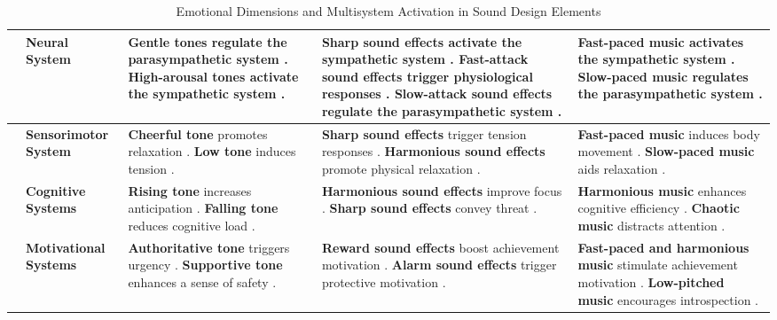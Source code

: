 \begin{table*}[ht]
\begin{tabularx}{\textwidth}{|>{\centering\arraybackslash}m{0.6cm}|>{\centering\arraybackslash}m{1.55cm}|>{\centering\arraybackslash}m{4.6cm}|>{\centering\arraybackslash}m{4.6cm}|>{\centering\arraybackslash}m{4.6cm}|}
\multirow{4}{*}{\rotatebox{90}{\parbox{3cm}{\centering \textbf{Multisystem \\ Activation}}}} & 
\cellcolor[HTML]{F0EFF7} \textbf{Neural System} & 
\textbf{Gentle tones} regulate the parasympathetic system \cite{gobl2003role}. \textbf{High-arousal tones} activate the sympathetic system \cite{bestelmeyer2017effects}. & 
\textbf{Sharp sound effects} activate the sympathetic system \cite{iversen2000emotional}. \textbf{Fast-attack sound effects} trigger physiological responses \cite{iversen2000emotional}. \textbf{Slow-attack sound effects} regulate the parasympathetic system \cite{iversen2000emotional}. & 
\textbf{Fast-paced music} activates the sympathetic system \cite{juslin2008emotional}. \textbf{Slow-paced music} regulates the parasympathetic system \cite{juslin2008emotional}. \\ \cline{2-5}

& \cellcolor[HTML]{F0EFF7} \textbf{Sensorimotor System} & 
\textbf{Cheerful tone} promotes relaxation \cite{frijda1986emotions}. \textbf{Low tone} induces tension \cite{james1884mind}. & 
\textbf{Sharp sound effects} trigger tension responses \cite{iversen2000emotional, plutchik1980general}. \textbf{Harmonious sound effects} promote physical relaxation \cite{james1884mind}. & 
\textbf{Fast-paced music} induces body movement \cite{thaut2015neurobiological}. \textbf{Slow-paced music} aids relaxation \cite{bernardi2006cardiovascular}. \\ \cline{2-5}

& \cellcolor[HTML]{F0EFF7} \textbf{Cognitive Systems} & 
\textbf{Rising tone} increases anticipation \cite{zajonc1980feeling}. \textbf{Falling tone} reduces cognitive load \cite{schirmer2010mark}. & 
\textbf{Harmonious sound effects} improve focus \cite{schulte2001quality}. \textbf{Sharp sound effects} convey threat \cite{schulte2001quality}. & 
\textbf{Harmonious music} enhances cognitive efficiency \cite{zajonc1980feeling}. \textbf{Chaotic music} distracts attention \cite{hofbauer2024background}. \\ \cline{2-5}

& \cellcolor[HTML]{F0EFF7} \textbf{Motivational Systems} & 
\textbf{Authoritative tone} triggers urgency \cite{fogg2009behavior}. \textbf{Supportive tone} enhances a sense of safety \cite{weinstein2018you}. & 
\textbf{Reward sound effects} boost achievement motivation \cite{fogg2009behavior}. \textbf{Alarm sound effects} trigger protective motivation \cite{mazur2019effects}. & 
\textbf{Fast-paced and harmonious music} stimulate achievement motivation \cite{juslin2008emotional}. \textbf{Low-pitched music} encourages introspection \cite{hofbauer2024background}. \\ \hline

\end{tabularx}
\caption{Emotional Dimensions and Multisystem Activation in Sound Design Elements} 
\label{tab:sound_design}
\end{table*}
